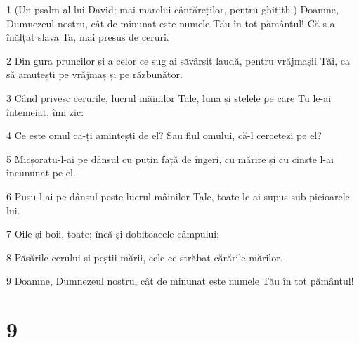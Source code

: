 \par 1 (Un psalm al lui David; mai-marelui cântăreților, pentru ghitith.) Doamne, Dumnezeul nostru, cât de minunat este numele Tău în tot pământul! Că s-a înălțat slava Ta, mai presus de ceruri.
\par 2 Din gura pruncilor și a celor ce sug ai săvârșit laudă, pentru vrăjmașii Tăi, ca să amuțești pe vrăjmaș și pe răzbunător.
\par 3 Când privesc cerurile, lucrul mâinilor Tale, luna și stelele pe care Tu le-ai întemeiat, îmi zic:
\par 4 Ce este omul că-ți amintești de el? Sau fiul omului, că-l cercetezi pe el?
\par 5 Micșoratu-l-ai pe dânsul cu puțin față de îngeri, cu mărire și cu cinste l-ai încununat pe el.
\par 6 Pusu-l-ai pe dânsul peste lucrul mâinilor Tale, toate le-ai supus sub picioarele lui.
\par 7 Oile și boii, toate; încă și dobitoacele câmpului;
\par 8 Păsările cerului și peștii mării, cele ce străbat cărările mărilor.
\par 9 Doamne, Dumnezeul nostru, cât de minunat este numele Tău în tot pământul!

\chapter{9}

